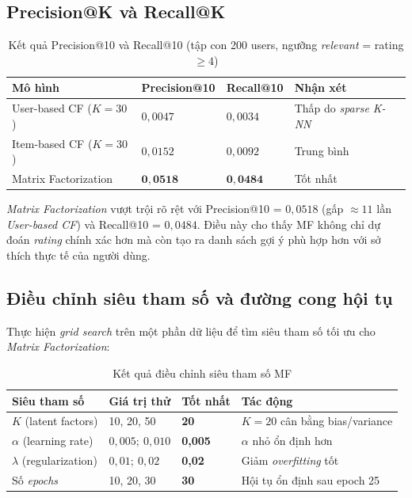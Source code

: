 \documentclass[../BTL.tex]{subfiles}
\begin{document}
\subsection{Precision@K và Recall@K}
\label{section:3.7.2}

\begin{table}[H]
    \centering
    \caption{Kết quả Precision@10 và Recall@10 (tập con 200 users,
    ngưỡng \textit{relevant} = rating $\geq 4$)}
    \label{tab:pr}
    \begin{tabular}{llll}
        \toprule
        \textbf{Mô hình}        & \textbf{Precision@10}
            & \textbf{Recall@10} & \textbf{Nhận xét} \\
        \midrule
        User-based CF ($K=30$)  & $0{,}0047$ & $0{,}0034$
            & Thấp do \textit{sparse K-NN} \\
        Item-based CF ($K=30$)  & $0{,}0152$ & $0{,}0092$
            & Trung bình \\
        Matrix Factorization    & $\mathbf{0{,}0518}$ & $\mathbf{0{,}0484}$
            & Tốt nhất \\
        \bottomrule
    \end{tabular}
\end{table}

\textit{Matrix Factorization} vượt trội rõ rệt với Precision@10 = $0{,}0518$
(gấp ${\approx}11$ lần \textit{User-based CF}) và Recall@10 = $0{,}0484$.
Điều này cho thấy MF không chỉ dự đoán \textit{rating} chính xác hơn mà
còn tạo ra danh sách gợi ý phù hợp hơn với sở thích thực tế của người dùng.

\subsection{Điều chỉnh siêu tham số và đường cong hội tụ}
\label{section:3.7.3}

Thực hiện \textit{grid search} trên một phần dữ liệu để tìm siêu tham số
tối ưu cho \textit{Matrix Factorization}:

\begin{table}[H]
    \centering
    \caption{Kết quả điều chỉnh siêu tham số MF}
    \label{tab:hyperparam}
    \begin{tabular}{llll}
        \toprule
        \textbf{Siêu tham số} & \textbf{Giá trị thử}
            & \textbf{Tốt nhất} & \textbf{Tác động} \\
        \midrule
        $K$ (latent factors)  & 10, 20, 50       & \textbf{20}
            & $K=20$ cân bằng bias/variance \\
        $\alpha$ (learning rate) & $0{,}005;\ 0{,}010$ & \textbf{0,005}
            & $\alpha$ nhỏ ổn định hơn \\
        $\lambda$ (regularization) & $0{,}01;\ 0{,}02$ & \textbf{0,02}
            & Giảm \textit{overfitting} tốt \\
        Số \textit{epochs}    & 10, 20, 30       & \textbf{30}
            & Hội tụ ổn định sau epoch 25 \\
        \bottomrule
    \end{tabular}
\end{table}
\end{document}
